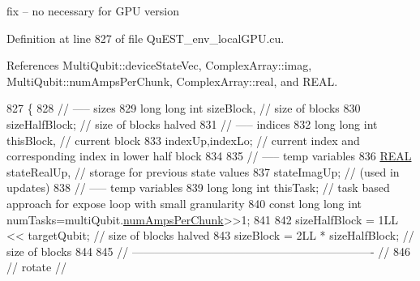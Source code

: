 fix -- no necessary for G\+PU version 

Definition at line 827 of file Qu\+E\+S\+T\+\_\+env\+\_\+local\+G\+P\+U.\+cu.



References Multi\+Qubit\+::device\+State\+Vec, Complex\+Array\+::imag, Multi\+Qubit\+::num\+Amps\+Per\+Chunk, Complex\+Array\+::real, and R\+E\+AL.


\begin{DoxyCode}
827                                                                           \{
828     \textcolor{comment}{// ----- sizes}
829     \textcolor{keywordtype}{long} \textcolor{keywordtype}{long} \textcolor{keywordtype}{int} sizeBlock,                                           \textcolor{comment}{// size of blocks}
830          sizeHalfBlock;                                       \textcolor{comment}{// size of blocks halved}
831     \textcolor{comment}{// ----- indices}
832     \textcolor{keywordtype}{long} \textcolor{keywordtype}{long} \textcolor{keywordtype}{int} thisBlock,                                           \textcolor{comment}{// current block}
833          indexUp,indexLo;                                     \textcolor{comment}{// current index and corresponding index in
       lower half block}
834 
835     \textcolor{comment}{// ----- temp variables}
836     \mbox{\hyperlink{QuEST__precision_8h_a4b654506f18b8bfd61ad2a29a7e38c25}{REAL}}   stateRealUp,                             \textcolor{comment}{// storage for previous state values}
837            stateImagUp;                             \textcolor{comment}{// (used in updates)}
838     \textcolor{comment}{// ----- temp variables}
839     \textcolor{keywordtype}{long} \textcolor{keywordtype}{long} \textcolor{keywordtype}{int} thisTask;                                   \textcolor{comment}{// task based approach for expose loop with
       small granularity}
840     \textcolor{keyword}{const} \textcolor{keywordtype}{long} \textcolor{keywordtype}{long} \textcolor{keywordtype}{int} numTasks=multiQubit.\mbox{\hyperlink{structMultiQubit_a1cad83601a78635dd278259c7ed54f18}{numAmpsPerChunk}}>>1;
841 
842     sizeHalfBlock = 1LL << targetQubit;                               \textcolor{comment}{// size of blocks halved}
843     sizeBlock     = 2LL * sizeHalfBlock;                           \textcolor{comment}{// size of blocks}
844 
845     \textcolor{comment}{// ---------------------------------------------------------------- //}
846     \textcolor{comment}{//            rotate                                                //}

\end{DoxyCode}
